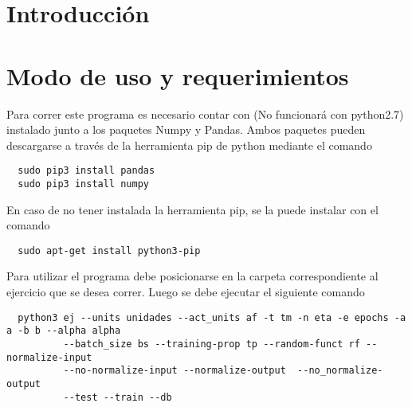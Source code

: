 \section{Introducción}


\section{Modo de uso y requerimientos}
Para correr este programa es necesario contar con  (No funcionará con python2.7) instalado junto a los paquetes Numpy y Pandas. Ambos paquetes pueden descargarse a través
de la herramienta pip de python mediante el comando
\begin{verbatim}
  sudo pip3 install pandas
  sudo pip3 install numpy
\end{verbatim}
En caso de no tener instalada la herramienta pip, se la puede instalar con el comando
\begin{verbatim}
  sudo apt-get install python3-pip
\end{verbatim}

Para utilizar el programa debe posicionarse en la carpeta correspondiente al ejercicio que se desea correr. Luego se debe ejecutar el siguiente comando
\begin{verbatim}
  python3 ej --units unidades --act_units af -t tm -n eta -e epochs -a a -b b --alpha alpha
          --batch_size bs --training-prop tp --random-funct rf --normalize-input
          --no-normalize-input --normalize-output  --no_normalize-output
          --test --train --db
\end{verbatim}

